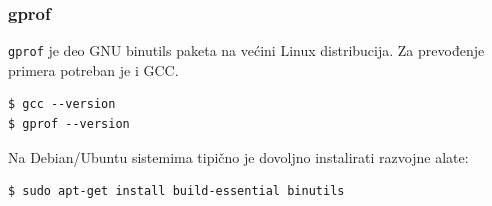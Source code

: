 \subsubsection{gprof}\label{instalacija-gprof}

\texttt{gprof} je deo GNU binutils paketa na većini Linux distribucija. Za prevođenje primera potreban je i GCC.

\begin{verbatim}
$ gcc --version
$ gprof --version
\end{verbatim}

Na Debian/Ubuntu sistemima tipično je dovoljno instalirati razvojne alate:

\begin{verbatim}
$ sudo apt-get install build-essential binutils
\end{verbatim}
